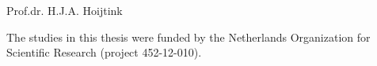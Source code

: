 \documentclass[12pt, a4paper]{book}\usepackage[]{graphicx}\usepackage{xcolor}
\begin{document}
Prof.dr. H.J.A. Hoijtink


\vspace*{\fill}

\noindent The studies in this thesis were funded by the Netherlands Organization for Scientific Research (project 452-12-010).
%
%
%
%
%
%
%
%
%
%
%
\end{document}
